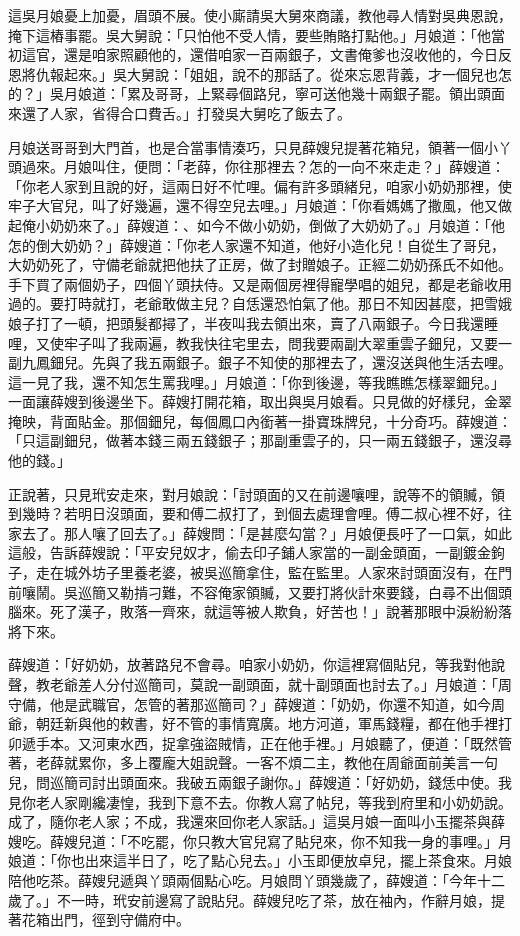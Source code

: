 這吳月娘憂上加憂，眉頭不展。使小廝請吳大舅來商議，教他尋人情對吳典恩說，掩下這樁事罷。吳大舅說：「只怕他不受人情，要些賄賂打點他。」月娘道：「他當初這官，還是咱家照顧他的，還借咱家一百兩銀子，文書俺爹也沒收他的，今日反恩將仇報起來。」吳大舅說：「姐姐，說不的那話了。從來忘恩背義，才一個兒也怎的？」吳月娘道：「累及哥哥，上緊尋個路兒，寧可送他幾十兩銀子罷。領出頭面來還了人家，省得合口費舌。」打發吳大舅吃了飯去了。

月娘送哥哥到大門首，也是合當事情湊巧，只見薛嫂兒提著花箱兒，領著一個小丫頭過來。月娘叫住，便問：「老薛，你往那裡去？怎的一向不來走走？」薛嫂道：「你老人家到且說的好，這兩日好不忙哩。偏有許多頭緒兒，咱家小奶奶那裡，使牢子大官兒，叫了好幾遍，還不得空兒去哩。」月娘道：「你看媽媽了撒風，他又做起俺小奶奶來了。」薛嫂道：、如今不做小奶奶，倒做了大奶奶了。」月娘道：「他怎的倒大奶奶？」薛嫂道：「你老人家還不知道，他好小造化兒！自從生了哥兒，大奶奶死了，守備老爺就把他扶了正房，做了封贈娘子。正經二奶奶孫氏不如他。手下買了兩個奶子，四個丫頭扶侍。又是兩個房裡得寵學唱的姐兒，都是老爺收用過的。要打時就打，老爺敢做主兒？自恁還恐怕氣了他。那日不知因甚麼，把雪娥娘子打了一頓，把頭髮都撏了，半夜叫我去領出來，賣了八兩銀子。今日我還睡哩，又使牢子叫了我兩遍，教我快往宅里去，問我要兩副大翠重雲子鈿兒，又要一副九鳳鈿兒。先與了我五兩銀子。銀子不知使的那裡去了，還沒送與他生活去哩。這一見了我，還不知怎生罵我哩。」月娘道：「你到後邊，等我瞧瞧怎樣翠鈿兒。」一面讓薛嫂到後邊坐下。薛嫂打開花箱，取出與吳月娘看。只見做的好樣兒，金翠掩映，背面貼金。那個鈿兒，每個鳳口內銜著一掛寶珠牌兒，十分奇巧。薛嫂道：「只這副鈿兒，做著本錢三兩五錢銀子；那副重雲子的，只一兩五錢銀子，還沒尋他的錢。」

正說著，只見玳安走來，對月娘說：「討頭面的又在前邊嚷哩，說等不的領贓，領到幾時？若明日沒頭面，要和傅二叔打了，到個去處理會哩。傅二叔心裡不好，往家去了。那人嚷了回去了。」薛嫂問：「是甚麼勾當？」月娘便長吁了一口氣，如此這般，告訴薛嫂說：「平安兒奴才，偷去印子鋪人家當的一副金頭面，一副鍍金鉤子，走在城外坊子里養老婆，被吳巡簡拿住，監在監里。人家來討頭面沒有，在門前嚷鬧。吳巡簡又勒掯刁難，不容俺家領贓，又要打將伙計來要錢，白尋不出個頭腦來。死了漢子，敗落一齊來，就這等被人欺負，好苦也！」說著那眼中淚紛紛落將下來。

薛嫂道：「好奶奶，放著路兒不會尋。咱家小奶奶，你這裡寫個貼兒，等我對他說聲，教老爺差人分付巡簡司，莫說一副頭面，就十副頭面也討去了。」月娘道：「周守備，他是武職官，怎管的著那巡簡司？」薛嫂道：「奶奶，你還不知道，如今周爺，朝廷新與他的敕書，好不管的事情寬廣。地方河道，軍馬錢糧，都在他手裡打卯遞手本。又河東水西，捉拿強盜賊情，正在他手裡。」月娘聽了，便道：「既然管著，老薛就累你，多上覆龐大姐說聲。一客不煩二主，教他在周爺面前美言一句兒，問巡簡司討出頭面來。我破五兩銀子謝你。」薛嫂道：「好奶奶，錢恁中使。我見你老人家剛纔凄惶，我到下意不去。你教人寫了帖兒，等我到府里和小奶奶說。成了，隨你老人家；不成，我還來回你老人家話。」這吳月娘一面叫小玉擺茶與薛嫂吃。薛嫂兒道：「不吃罷，你只教大官兒寫了貼兒來，你不知我一身的事哩。」月娘道：「你也出來這半日了，吃了點心兒去。」小玉即便放卓兒，擺上茶食來。月娘陪他吃茶。薛嫂兒遞與丫頭兩個點心吃。月娘問丫頭幾歲了，薛嫂道：「今年十二歲了。」不一時，玳安前邊寫了說貼兒。薛嫂兒吃了茶，放在袖內，作辭月娘，提著花箱出門，徑到守備府中。

